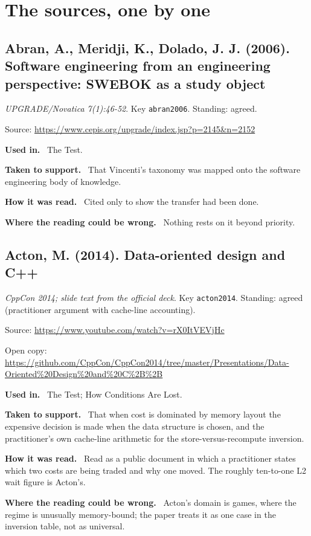\documentclass[11pt,oneside]{article}
\newcommand{\field}[1]{\par\noindent\textbf{\color{accent}#1.}\ }
\begin{document}
\section*{The sources, one by one}
\hypertarget{src:abran2006}{}
\subsection*{Abran, A., Meridji, K., Dolado, J. J. (2006). Software engineering from an engineering perspective: SWEBOK as a study object}
\noindent\small\emph{UPGRADE/Novatica 7(1):46-52}. Key \texttt{abran2006}. Standing: agreed.
\par\noindent\small Source: \url{https://www.cepis.org/upgrade/index.jsp?p=2145&n=2152}
\normalsize
\field{Used in} The Test.
\field{Taken to support} That Vincenti's taxonomy was mapped onto the software engineering body of knowledge.
\field{How it was read} Cited only to show the transfer had been done.
\field{Where the reading could be wrong} Nothing rests on it beyond priority.

\hypertarget{src:acton2014}{}
\subsection*{Acton, M. (2014). Data-oriented design and C++}
\noindent\small\emph{CppCon 2014; slide text from the official deck}. Key \texttt{acton2014}. Standing: agreed (practitioner argument with cache-line accounting).
\par\noindent\small Source: \url{https://www.youtube.com/watch?v=rX0ItVEVjHc}
\par\noindent\small Open copy: \url{https://github.com/CppCon/CppCon2014/tree/master/Presentations/Data-Oriented%20Design%20and%20C%2B%2B}
\normalsize
\field{Used in} The Test; How Conditions Are Lost.
\field{Taken to support} That when cost is dominated by memory layout the expensive decision is made when the data structure is chosen, and the practitioner's own cache-line arithmetic for the store-versus-recompute inversion.
\field{How it was read} Read as a public document in which a practitioner states which two costs are being traded and why one moved. The roughly ten-to-one L2 wait figure is Acton's.
\field{Where the reading could be wrong} Acton's domain is games, where the regime is unusually memory-bound; the paper treats it as one case in the inversion table, not as universal.

\hypertarget{src:aggarwal1987}{}
\end{document}
